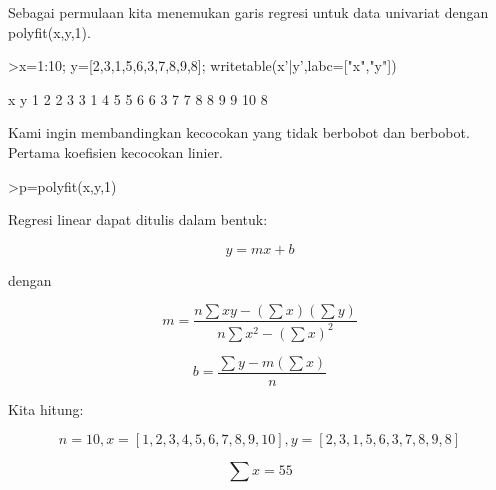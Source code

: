 \documentclass{article}
\begin{document}
\begin{eulernotebook}
\begin{eulercomment}
\begin{eulercomment}
\begin{eulercomment}
Sebagai permulaan kita menemukan garis regresi untuk data univariat
dengan polyfit(x,y,1).
\end{eulercomment}
\begin{eulerprompt}
>x=1:10; y=[2,3,1,5,6,3,7,8,9,8]; writetable(x'|y',labc=["x","y"])
\end{eulerprompt}
\begin{euleroutput}
           x         y
           1         2
           2         3
           3         1
           4         5
           5         6
           6         3
           7         7
           8         8
           9         9
          10         8
\end{euleroutput}
\begin{eulercomment}
Kami ingin membandingkan kecocokan yang tidak berbobot dan berbobot.
Pertama koefisien kecocokan linier.
\end{eulercomment}
\begin{eulerprompt}
>p=polyfit(x,y,1)
\end{eulerprompt}
\begin{euleroutput}
  [0.733333,  0.812121]
\end{euleroutput}
\begin{eulercomment}
Regresi linear dapat ditulis dalam bentuk:\\
\end{eulercomment}
\begin{eulerformula}
\[
y=mx + b
\]
\end{eulerformula}
\begin{eulercomment}
dengan\\
\end{eulercomment}
\begin{eulerformula}
\[
m = \frac{n \sum xy - (\sum x)(\sum y)}{n \sum x^2 - (\sum x)^2}
\]
\end{eulerformula}
\begin{eulerformula}
\[
b = \frac{\sum y - m (\sum x)}{n}
\]
\end{eulerformula}
\begin{eulercomment}
Kita hitung:\\
\end{eulercomment}
\begin{eulerformula}
\[
n = 10, x=[1,2,3,4,5,6,7,8,9,10], y=[2,3,1,5,6,3,7,8,9,8]
\]
\end{eulerformula}
\begin{eulerformula}
\[
\sum x = 55
\]
\end{eulerformula}
\begin{eulerformula}

\end{eulerformula}
\end{eulercomment}
\end{eulercomment}
\end{eulernotebook}
\end{document}
